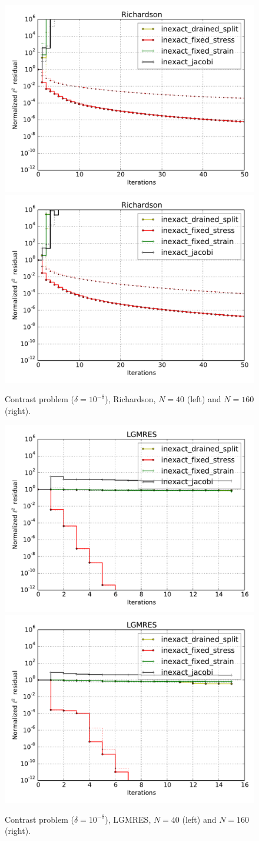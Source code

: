 \documentclass{article}
\begin{document}
\begin{figure}
\begin{center}
\includegraphics[width=0.49\linewidth]{../Richardson,problem=1,exact=0,N=40.pdf}
\includegraphics[width=0.49\linewidth]{../Richardson,problem=1,exact=0,N=160.pdf}
\caption{Contrast problem ($\delta=10^{-8}$), Richardson, $N=40$ (left) and $N=160$ (right).}
\label{contrast-richardson}
\end{center}
\end{figure}

\begin{figure}
\begin{center}
\includegraphics[width=0.49\linewidth]{../LGMRES,problem=1,exact=0,N=40,cycles=1.pdf}
\includegraphics[width=0.49\linewidth]{../LGMRES,problem=1,exact=0,N=160,cycles=1.pdf}
\caption{Contrast problem ($\delta=10^{-8}$), LGMRES, $N=40$ (left) and $N=160$ (right).}
\label{contrast-lgmres}
\end{center}
\end{figure}
\end{document}
